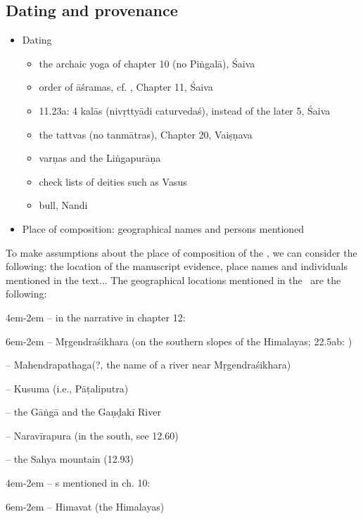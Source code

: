 \documentclass[11pt]{book}
\begin{document}
\subsection{Dating and provenance}

\begin{itemize}

\item
  Dating

  \begin{itemize}
  
  \item
    the archaic yoga of chapter 10 (no Piṅgalā), Śaiva
  \item
    order of āśramas, cf. , Chapter 11, Śaiva
  \item
    11.23a: 4 kalās (nivṛttyādi caturvedaś), instead of the later 5,
    Śaiva
  \item
    the tattvas (no tanmātras), Chapter 20, Vaiṣṇava
  \item
    varṇas and the Liṅgapurāṇa
  \item
    check lists of deities such as Vasus
  \item
bull, Nandi
  \end{itemize}
\item
  Place of composition: geographical names and persons mentioned
\end{itemize}

To make assumptions about the place of composition of the \Vss,
we can consider the following: the location of the manuscript 
evidence, place names and individuals mentioned in the text... 
The geographical locations 
mentioned in the \Vss\ are the following:

\leftskip4em\parindent-2em
-- in the narrative in chapter 12:

\leftskip6em\parindent-2em
-- Mṛgendraśikhara (on the southern slopes of
					the Himalayas; 22.5ab: 
		 			)
		 			
-- Mahendrapathaga(?, the name of a river near Mṛgendraśikhara)

-- Kusuma (i.e., Pāṭaliputra)

-- the Gāṅgā and the Gaṇḍakī River

-- Naravīrapura (in the south, see 12.60)

-- the Sahya mountain (12.93)

\leftskip4em\parindent-2em
-- s mentioned in ch. 10:

\leftskip6em\parindent-2em
    -- Himavat (the Himalayas)
    
\end{document}
